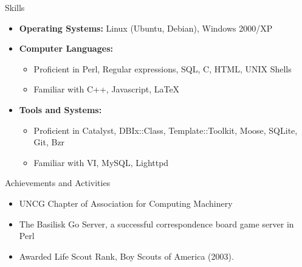 \documentclass[11pt,oneside]{article}
\newenvironment{ressection}[1]{
	\vspace{4pt}
	{\fontfamily{phv}\selectfont\Large#1}
	\begin{itemize}
	\vspace{3pt}
}{
	\end{itemize}
}
\newcommand{\resitem}[1]{
	\vspace{-4pt}
	\item \begin{flushleft} #1 \end{flushleft}
}
\newcommand{\ressubitem}[1]{
	\vspace{-1pt}
	\item \begin{flushleft} #1 \end{flushleft}
}
\newenvironment{reslist}[1]{
	\resitem{\textbf{#1}}
	\vspace{-5pt}
	\begin{itemize}
}{
	\end{itemize}
}
\begin{document}
\begin{ressection}{Skills}

	\resitem{\textbf{Operating Systems:} Linux (Ubuntu, Debian), Windows 2000/XP}

	\begin{reslist}{Computer Languages:}

		\ressubitem{Proficient in Perl, Regular expressions, SQL, C, HTML, UNIX Shells}

		\ressubitem{Familiar with C++, Javascript, \LaTeX}

	\end{reslist}

	\begin{reslist}{Tools and Systems:}

		\ressubitem{Proficient in Catalyst, DBIx::Class, Template::Toolkit, Moose, SQLite, Git, Bzr}

		\ressubitem{Familiar with VI, MySQL, Lighttpd}

	\end{reslist}


\end{ressection}


\begin{ressection}{Achievements and Activities}

	\resitem{UNCG Chapter of Association for Computing Machinery}

	\resitem{The Basilisk Go Server, a successful correspondence board game server in Perl}

	\resitem{Awarded Life Scout Rank, Boy Scouts of America (2003).}


\end{ressection}
\end{document}
